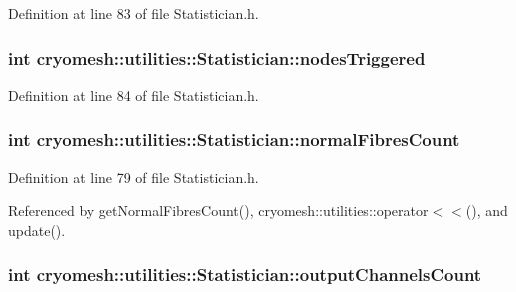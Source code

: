 \-Definition at line 83 of file \-Statistician.\-h.

\hypertarget{classcryomesh_1_1utilities_1_1Statistician_a5a38000033e2405dcfac5ef48d2a6820}{
\subsubsection[{nodes\-Triggered}]{\setlength{\rightskip}{0pt plus 5cm}int {\bf cryomesh\-::utilities\-::\-Statistician\-::nodes\-Triggered}}}\label{classcryomesh_1_1utilities_1_1Statistician_a5a38000033e2405dcfac5ef48d2a6820}


\-Definition at line 84 of file \-Statistician.\-h.

\hypertarget{classcryomesh_1_1utilities_1_1Statistician_a1540b6a7e491f9241f31fbcfd62bdd74}{
\subsubsection[{normal\-Fibres\-Count}]{\setlength{\rightskip}{0pt plus 5cm}int {\bf cryomesh\-::utilities\-::\-Statistician\-::normal\-Fibres\-Count}}}\label{classcryomesh_1_1utilities_1_1Statistician_a1540b6a7e491f9241f31fbcfd62bdd74}


\-Definition at line 79 of file \-Statistician.\-h.



\-Referenced by get\-Normal\-Fibres\-Count(), cryomesh\-::utilities\-::operator$<$$<$(), and update().

\hypertarget{classcryomesh_1_1utilities_1_1Statistician_aa13c9110a9a210b7656ec815166f20c2}{
\subsubsection[{output\-Channels\-Count}]{\setlength{\rightskip}{0pt plus 5cm}int {\bf cryomesh\-::utilities\-::\-Statistician\-::output\-Channels\-Count}}}\label{classcryomesh_1_1utilities_1_1Statistician_aa13c9110a9a210b7656ec815166f20c2}


